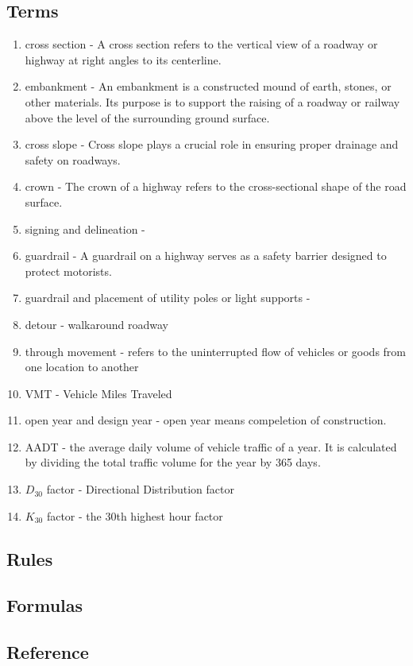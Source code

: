 \documentclass{article}
\begin{document}
  \subsection{Terms}
  \begin{enumerate}
    \item cross section - A cross section refers to the vertical view of a roadway or highway at right angles to its centerline. 
    \item embankment - An embankment is a constructed mound of earth, stones, or other materials. Its purpose is to support the raising of a roadway or railway above the level of the surrounding ground surface.
    \item cross slope - Cross slope plays a crucial role in ensuring proper drainage and safety on roadways.
    \item crown - The crown of a highway refers to the cross-sectional shape of the road surface.
    \item signing and delineation -  
    \item guardrail - A guardrail on a highway serves as a safety barrier designed to protect motorists.
    \item guardrail and placement of utility poles or light supports - 
    \item  detour - walkaround roadway  
    \item through movement - refers to the uninterrupted flow of vehicles or goods from one location to another 
    \item VMT - Vehicle Miles Traveled
    \item open year and design year - open year means compeletion of construction. 
    \item AADT - the average daily volume of vehicle traffic of a year. It is calculated by dividing the total traffic volume for the year by 365 days.
    \item $D_{30}$ factor - Directional Distribution factor 
    \item $K_{30}$ factor - the 30th highest hour factor 
  \end{enumerate}

  \subsection{Rules}

  \subsection{Formulas}

  \subsection{Reference}
\end{document}
